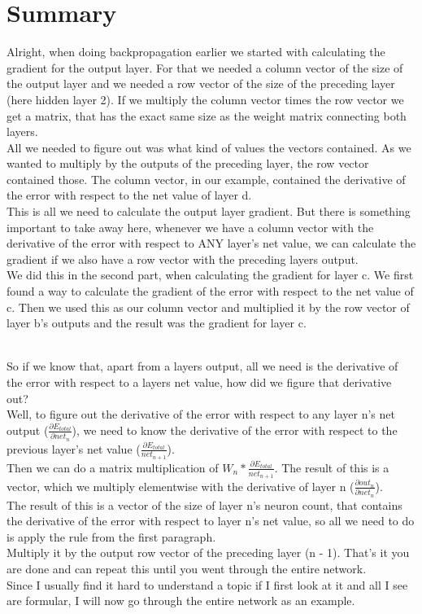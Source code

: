 \documentclass[11pt, halfparskip]{article}
\begin{document}
    \section{Summary}
    \label{sec:summary}
    \noindent
    Alright, when doing backpropagation earlier we started with calculating the gradient for the output layer. For that we needed a column vector of the size of the output layer and we
    needed a row vector of the size of the preceding layer (here hidden layer 2). If we multiply the column vector times the row vector we get a matrix, that has the exact same size
    as the weight matrix connecting both layers.\\
    All we needed to figure out was what kind of values the vectors contained. As we wanted to multiply by the outputs of the preceding layer, the row vector contained those. The
    column vector, in our example, contained the derivative of the error with respect to the net value of layer d.\\
    This is all we need to calculate the output layer gradient. But there is something important to take away here, whenever we have a column vector with the derivative of the error
    with respect to ANY layer's net value, we can calculate the gradient if we also have a row vector with the preceding layers output.\\
    We did this in the second part, when calculating the gradient for layer c. We first found a way to calculate the gradient of the error with respect to the net value of c. Then we used
    this as our column vector and multiplied it by the row vector of layer b's outputs and the result was the gradient for layer c.
    
    \noindent \\
    So if we know that, apart from a layers output, all we need is the derivative of the error with respect to a layers net value, how did we figure that derivative out?\\
    Well, to figure out the derivative of the error with respect to any layer n's net output ($\frac{\partial E_{total}}{\partial net_n}$), we need to know the derivative of the error with
    respect to the previous layer's net value ($\frac{\partial E_{total}}{net_{n + 1}}$).\\
    Then we can do a matrix multiplication of $W_n * \frac{\partial E_{total}}{net_{n + 1}}$. The result of this is a vector, which we multiply elementwise with the derivative of layer n
    ($\frac{\partial out_n}{\partial net_n}$).\\
    The result of this is a vector of the size of layer n's neuron count, that contains the derivative of the error with respect to layer n's net value, so all we need to do is apply the rule
    from the first paragraph.\\
    Multiply it by the output row vector of the preceding layer (n - 1). That's it you are done and can repeat this until you went through the entire network.\\
    Since I usually find it hard to understand a topic if I first look at it and all I see are formular, I will now go through the entire network as an example.
    
\end{document}
